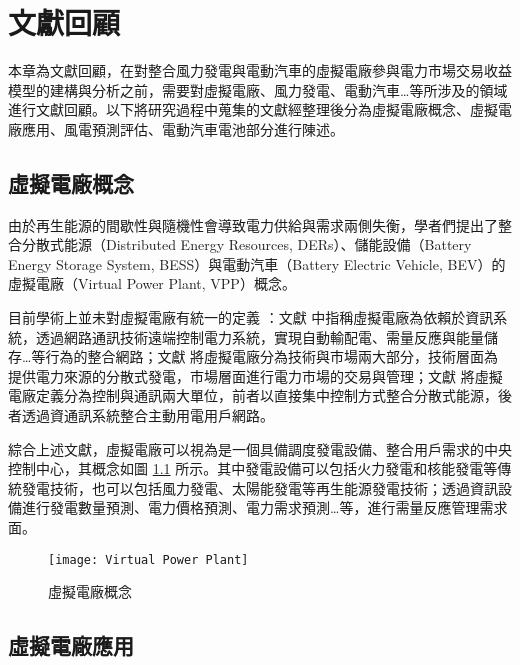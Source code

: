 
\chapter{文獻回顧}

本章為文獻回顧，在對整合風力發電與電動汽車的虛擬電廠參與電力市場交易收益模型的建構與分析之前，需要對虛擬電廠、風力發電、電動汽車…等所涉及的領域進行文獻回顧。以下將研究過程中蒐集的文獻經整理後分為虛擬電廠概念、虛擬電廠應用、風電預測評估、電動汽車電池部分進行陳述。

\section{虛擬電廠概念}

由於再生能源的間歇性與隨機性會導致電力供給與需求兩側失衡，學者們提出了整合分散式能源（Distributed Energy Resources, DERs）、儲能設備（Battery Energy Storage System, BESS）與電動汽車（Battery Electric Vehicle, BEV）的虛擬電廠（Virtual Power Plant, VPP）概念。

目前學術上並未對虛擬電廠有統一的定義 \cite{setiawan2007concept}：文獻 \cite{Asmus2010} 中指稱虛擬電廠為依賴於資訊系統，透過網路通訊技術遠端控制電力系統，實現自動輸配電、需量反應與能量儲存…等行為的整合網路；文獻 \cite{Pudjianto2007, Pudjianto2017} 將虛擬電廠分為技術與市場兩大部分，技術層面為提供電力來源的分散式發電，市場層面進行電力市場的交易與管理；文獻 \cite{braun2008review} 將虛擬電廠定義分為控制與通訊兩大單位，前者以直接集中控制方式整合分散式能源，後者透過資通訊系統整合主動用電用戶網路。

綜合上述文獻，虛擬電廠可以視為是一個具備調度發電設備、整合用戶需求的中央控制中心，其概念如圖 \ref{figure: Virtual Power Plant} 所示。其中發電設備可以包括火力發電和核能發電等傳統發電技術，也可以包括風力發電、太陽能發電等再生能源發電技術；透過資訊設備進行發電數量預測、電力價格預測、電力需求預測…等，進行需量反應管理需求面。

\begin{figure}[htbp]
  \centering
  \texttt{[image: Virtual Power Plant]}
  \caption{虛擬電廠概念}
  \label{figure: Virtual Power Plant}
\end{figure}

\section{虛擬電廠應用}

